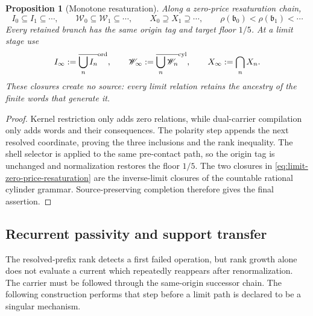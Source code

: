 \documentclass[11pt]{article}
\numberwithin{section}{part}
\theoremstyle{plain}
\newtheorem{proposition}[proposition]{Proposition}
\theoremstyle{definition}
\theoremstyle{remark}
\begin{document}
\begin{proposition}[Monotone resaturation]
\label{prop:monotone-zero-price-resaturation}
Along a zero-price resaturation chain,
\begin{equation}
 \label{eq:monotone-zero-price-resaturation}
 I_0\subseteq I_1\subseteq\cdots,
 \qquad
 \mathscr W_0\subseteq\mathscr W_1\subseteq\cdots,
 \qquad X_0\supseteq X_1\supseteq\cdots,
 \qquad \rho(\mathfrak b_0)<\rho(\mathfrak b_1)<\cdots
\end{equation}
Every retained branch has the same origin tag and target floor \(1/5\).
At a limit stage use
\begin{equation}
 \label{eq:limit-zero-price-resaturation}
 I_\infty:=\overline{\bigcup_n I_n}^{\rm ord},
 \qquad
 \mathscr W_\infty:=\overline{\bigcup_n\mathscr W_n}^{\rm cyl},
 \qquad
 X_\infty:=\bigcap_nX_n .
\end{equation}
These closures create no source: every limit relation retains the ancestry of
the finite words that generate it.
\end{proposition}

\begin{proof}
Kernel restriction only adds zero relations, while dual-carrier compilation
only adds words and their consequences.  The polarity step appends the next
resolved coordinate, proving the three inclusions and the rank inequality.
The shell selector is applied to the same pre-contact path, so the origin tag
is unchanged and normalization restores the floor \(1/5\).  The two closures
in \eqref{eq:limit-zero-price-resaturation} are the inverse-limit closures of
the countable rational cylinder grammar.  Source-preserving completion
therefore gives the final assertion.
\end{proof}

\subsection{Recurrent passivity and support transfer}
\label{subsec:terminal-passivity-support}

The resolved-prefix rank detects a first failed operation, but rank growth
alone does not evaluate a current which repeatedly reappears after
renormalization.  The carrier must be followed through the same-origin
successor chain.  The following construction performs that step before a
limit path is declared to be a singular mechanism.
\end{document}
